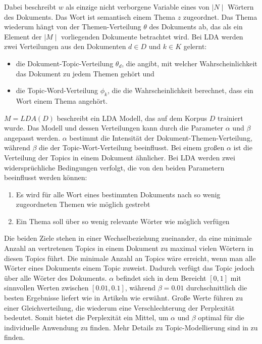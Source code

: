 \documentclass[german,version-2020-11]{uzl-thesis}
\begin{document}
Dabei beschreibt $w$ als einzige nicht verborgene Variable eines von $\mid N \mid$ Wörtern des Dokuments. Das Wort ist semantisch einem Thema $z$ zugeordnet. Das Thema wiederum hängt von der Themen-Verteilung $\theta$ des Dokuments ab, das als ein Element der $\mid M \mid$ vorliegenden Dokumente betrachtet wird. Bei LDA werden zwei Verteilungen aus den Dokumenten $d \in D$ und $k \in K$ gelernt: 

\begin{itemize}
\item die Dokument-Topic-Verteilung $\theta_d$, die angibt, mit welcher Wahrscheinlichkeit das Dokument zu jedem Themen gehört und 
\item die Topic-Word-Verteilung $\phi_k$, die die Wahrscheinlichkeit berechnet, dass ein Wort einem Thema angehört. 
\end{itemize}

$M = LDA(D)$ beschreibt ein LDA Modell, das auf dem Korpus $D$ trainiert wurde. Das Modell und dessen Verteilungen kann durch die Parameter $\alpha$ und $\beta$ angepasst werden. $\alpha$ bestimmt die Intensität der Dokument-Themen-Verteilung, während $\beta$ die der Topic-Wort-Verteilung beeinflusst. Bei einem großen $\alpha$ ist die Verteilung der Topics in einem Dokument ähnlicher. Bei LDA werden zwei widersprüchliche Bedingungen verfolgt, die von den beiden Parametern beeinflusst werden können:
\begin{enumerate}
\item Es wird für alle Wort eines bestimmten Dokuments nach so wenig zugeordneten Themen wie möglich gestrebt
\item Ein Thema soll über so wenig relevante Wörter wie möglich verfügen
\end{enumerate}

Die beiden Ziele stehen in einer Wechselbeziehung zueinander, da eine minimale Anzahl an vertretenen Topics in einem Dokument zu maximal vielen Wörtern in diesen Topics führt. Die minimale Anzahl an Topics wäre erreicht, wenn man alle Wörter eines Dokuments einem Topic zuweist. Dadurch verfügt das Topic jedoch über alle Wörter des Dokuments. $\alpha$ befindet sich in dem Bereicht $[0,1]$ mit sinnvollen Werten zwischen $[0.01, 0.1]$, während $\beta =0.01$ durchschnittlich die besten Ergebnisse liefert wie in Artikeln wie \cite{magnus} erwähnt. Große Werte führen zu einer Gleichverteilung, die wiederum eine Verschlechterung der Perplexität bedeutet. Somit bietet die Perplexität ein Mittel, um $\alpha$ und $\beta$ optimal für die individuelle Anwendung zu finden. Mehr Details zu Topic-Modellierung sind in \cite{towardsdat} zu finden.\\
\end{document}
